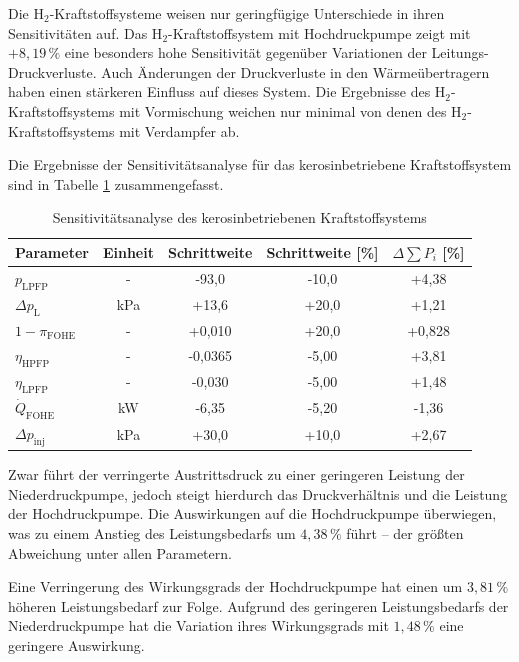 Die H$_2$-Kraftstoffsysteme weisen nur geringfügige Unterschiede in ihren Sensitivitäten auf. Das H$_2$-Kraftstoffsystem mit Hochdruckpumpe zeigt mit $+8,19\,\%$ eine besonders hohe Sensitivität gegenüber Variationen der Leitungs-Druckverluste. Auch Änderungen der Druckverluste in den Wärmeübertragern haben einen stärkeren Einfluss auf dieses System. Die Ergebnisse des H$_2$-Kraftstoffsystems mit Vormischung weichen nur minimal von denen des H$_2$-Kraftstoffsystems mit Verdampfer ab.

Die Ergebnisse der Sensitivitätsanalyse für das kerosinbetriebene Kraftstoffsystem sind in Tabelle \ref{Tab:sensjeta} zusammengefasst.

\begin{table}[ht]
	\centering
	\caption{Sensitivitätsanalyse des kerosinbetriebenen Kraftstoffsystems}
	\begin{tabular} {|l|c|c|c|c|} \hline%
		Parameter & Einheit & Schrittweite & Schrittweite [\%] & $ \Delta \sum P_i$ [\%] \\ \hline\hline%
		$p_\mathrm{LPFP}$ & - & -93,0 & -10,0 & +4,38 \\ \hline 
		$\Delta p_\mathrm{L}$ & \si{\kilo\Pa} & +13,6 & +20,0 & +1,21 \\ \hline 
		$1-\pi_\mathrm{FOHE}$ & - & +0,010 & +20,0 & +0,828 \\ \hline 
		$\eta_\mathrm{HPFP}$ & - & -0,0365 & -5,00 & +3,81 \\ \hline 
		$\eta_\mathrm{LPFP}$ & - & -0,030 & -5,00 & +1,48 \\ \hline 
		$\dot{Q}_\mathrm{FOHE}$ & \si{\kilo\W} & -6,35 & -5,20 & -1,36 \\ \hline 
		$\Delta p_\mathrm{inj}$ & \si{\kilo\Pa} & +30,0 & +10,0 & +2,67 \\ \hline 
	\end{tabular}	
	\label{Tab:sensjeta}%
\end{table}
\FloatBarrier 

Zwar führt der verringerte Austrittsdruck zu einer geringeren Leistung der Niederdruckpumpe, jedoch steigt hierdurch das Druckverhältnis und die Leistung der Hochdruckpumpe. Die Auswirkungen auf die Hochdruckpumpe überwiegen, was zu einem Anstieg des Leistungsbedarfs um $4,38\,\%$ führt – der größten Abweichung unter allen Parametern. 

Eine Verringerung des Wirkungsgrads der Hochdruckpumpe hat einen um $3,81\,\%$ höheren Leistungsbedarf zur Folge. Aufgrund des geringeren Leistungsbedarfs der Niederdruckpumpe hat die Variation ihres Wirkungsgrads mit $1,48\,\%$ eine geringere Auswirkung. 

